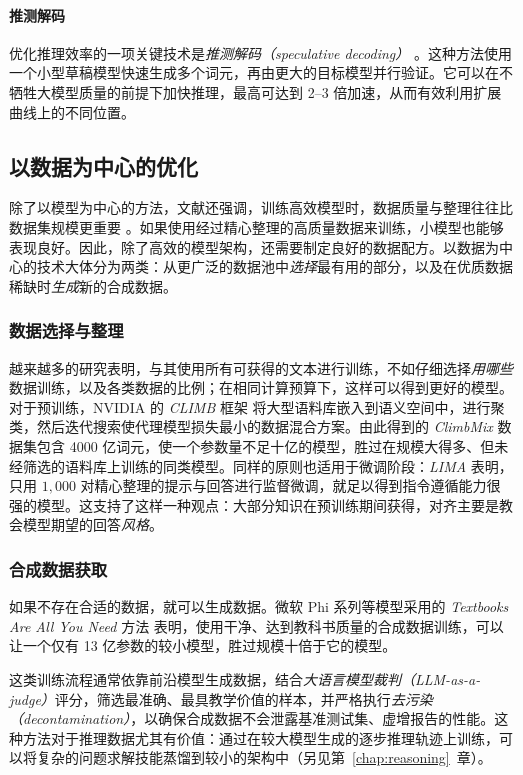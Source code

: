 \paragraph{推测解码} 优化推理效率的一项关键技术是\emph{推测解码（speculative decoding）} \citep{leviathan2023fast}。这种方法使用一个小型草稿模型快速生成多个词元，再由更大的目标模型并行验证。它可以在不牺牲大模型质量的前提下加快推理，最高可达到 2--3 倍加速，从而有效利用扩展曲线上的不同位置。

\subsection{以数据为中心的优化}
除了以模型为中心的方法，文献还强调，训练高效模型时，数据质量与整理往往比数据集规模更重要 \citep{luo-etal-2025-survey}。如果使用经过精心整理的高质量数据来训练，小模型也能够表现良好。因此，除了高效的模型架构，还需要制定良好的数据配方。以数据为中心的技术大体分为两类：从更广泛的数据池中\emph{选择}最有用的部分，以及在优质数据稀缺时\emph{生成}新的合成数据。

\subsubsection{数据选择与整理}
越来越多的研究表明，与其使用所有可获得的文本进行训练，不如仔细选择\emph{用哪些}数据训练，以及各类数据的比例；在相同计算预算下，这样可以得到更好的模型。对于预训练，NVIDIA 的 \emph{CLIMB} 框架 \citep{diao2026nemotron} 将大型语料库嵌入到语义空间中，进行聚类，然后迭代搜索使代理模型损失最小的数据混合方案。由此得到的 \emph{ClimbMix} 数据集包含 4000 亿词元，使一个参数量不足十亿的模型，胜过在规模大得多、但未经筛选的语料库上训练的同类模型。同样的原则也适用于微调阶段：\emph{LIMA} \citep{zhou2023lima} 表明，只用 $1{,}000$ 对精心整理的提示与回答进行监督微调，就足以得到指令遵循能力很强的模型。这支持了这样一种观点：大部分知识在预训练期间获得，对齐主要是教会模型期望的回答\emph{风格}。

\subsubsection{合成数据获取}
如果不存在合适的数据，就可以生成数据。微软 Phi 系列等模型采用的 {\em Textbooks Are All You Need} 方法 \citep{gunasekar2024textbooks} 表明，使用干净、达到教科书质量的合成数据训练，可以让一个仅有 13 亿参数的较小模型，胜过规模十倍于它的模型。

这类训练流程通常依靠前沿模型生成数据，结合{\em 大语言模型裁判（LLM-as-a-judge）}评分，筛选最准确、最具教学价值的样本，并严格执行\emph{去污染（decontamination）}，以确保合成数据不会泄露基准测试集、虚增报告的性能。这种方法对于推理数据尤其有价值：通过在较大模型生成的逐步推理轨迹上训练，可以将复杂的问题求解技能蒸馏到较小的架构中（另见第~\ref{chap:reasoning}~章）\citep{muennighoff2025s1, arora2026training}。

